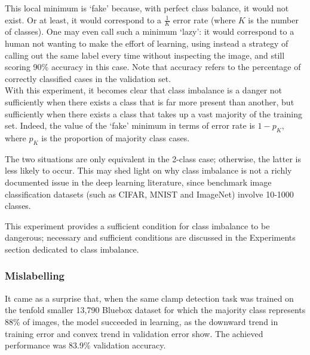 \documentclass[a4paper,11pt]{article}
\begin{document}
This local minimum is `fake' because, with perfect class balance, it would not exist. Or at least, it would correspond to a $\frac{1}{K}$ error rate (where $K$ is the number of classes). One may even call such a minimum `lazy': it would correspond to a human not wanting to make the effort of learning, using instead a strategy of calling out the same label every time without inspecting the image, and still scoring 90\% accuracy in this case. Note that accuracy refers to the percentage of correctly classified cases in the validation set. \\

With this experiment, it becomes clear that class imbalance is a danger not sufficiently when there exists a class that is far more present than another, but sufficiently when there exists a class that takes up a vast majority of the training set. Indeed, the value of the `fake' minimum in terms of error rate is $1 - p_K$, where $p_K$ is the proportion of majority class cases. 

The two situations are only equivalent in the 2-class case; otherwise, the latter is less likely to occur. This may shed light on why class imbalance is not a richly documented issue in the deep learning literature, since benchmark image classification datasets (such as CIFAR, MNIST and ImageNet) involve 10-1000 classes. 

This experiment provides a sufficient condition for class imbalance to be dangerous; necessary and sufficient conditions are discussed in the Experiments section dedicated to class imbalance.

\subsubsection{Mislabelling}

It came as a surprise that, when the same clamp detection task was trained on the tenfold smaller 13,790 Bluebox dataset for which the majority class represents 88\% of images, the model succeeded in learning, as the downward trend in training error and convex trend in validation error show. The achieved performance was 83.9\% validation accuracy.
\end{document}
